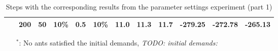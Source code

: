 \begin{sidewaystable}
\begin{tabular}{|l|l|l|l|l|l||c|c|c|c|c|c|}
    ~ & \textbf{200} & 50 & 10\% & 0.5 & 10\% & 11.0 & 11.3 & 11.7 & -279.25 & -272.78 & -265.13 \\
    \hline
    \end{tabular}
    \caption {Steps with the corresponding results from the parameter settings experiment (part 1)}
    \tiny
    \begin{itemize}[noitemsep]
    \item[$^*$:] No ants satisfied the initial demands, \emph{\color{blue} TODO: initial demands: }
    \end{itemize}
    \label{table:pm1}
\end{sidewaystable}



